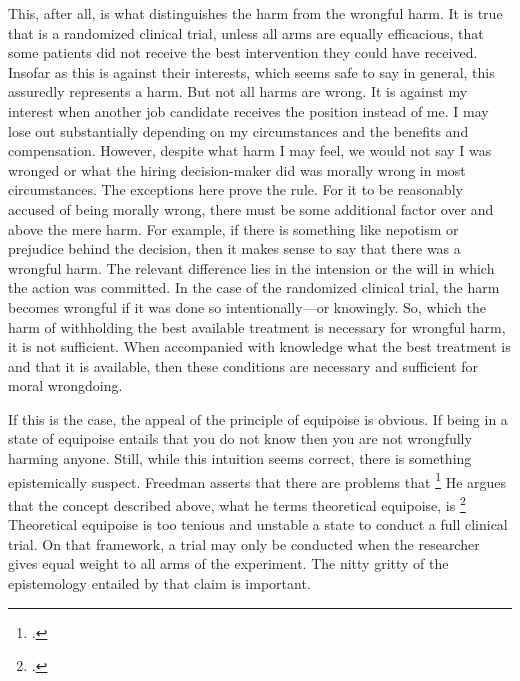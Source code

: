 \documentclass[letterpaper,notitlepage,12pt]{article}
\begin{document}
This, after all, is what distinguishes the harm from the wrongful harm.
It is true that is a randomized clinical trial, unless all arms are equally
efficacious, that some patients did not receive the best intervention they could
have received.
Insofar as this is against their interests, which seems safe to say in general,
this assuredly represents a harm.
But not all harms are wrong.
It is against my interest when another job candidate receives the position
instead of me.
I may lose out substantially depending on my circumstances and the benefits and
compensation.
However, despite what harm I may feel, we would not say I was wronged or what
the hiring decision-maker did was morally wrong in most circumstances.
The exceptions here prove the rule.
For it to be reasonably accused of being morally wrong, there must be some
additional factor over and above the mere harm.
For example, if there is something like nepotism or prejudice behind the
decision, then it makes sense to say that there was a wrongful harm.
The relevant difference lies in the intension or the will in which the action
was committed.
In the case of the randomized clinical trial, the harm becomes wrongful if it
was done so intentionally---or knowingly.
So, which the harm of withholding the best available treatment is necessary for
wrongful harm, it is not sufficient.
When accompanied with knowledge what the best treatment is and that it is
available, then these conditions are necessary and sufficient for moral
wrongdoing.

If this is the case, the appeal of the principle of equipoise is obvious.
If being in a state of equipoise entails that you do not know then you are not
wrongfully harming anyone.
Still, while this intuition seems correct, there is something epistemically
suspect.
Freedman asserts that there are problems that \footcite[p. 141]{freedman_equipoise_1987}
He argues that the concept described above, what he terms theoretical equipoise,
is \footcite[p.
429]{freedman_equipoise_1987}
Theoretical equipoise is too tenious and unstable a state to conduct a full
clinical trial.
On that framework, a trial may only be conducted when the researcher gives equal
weight to all arms of the experiment.
The nitty gritty of the epistemology entailed by that claim is important.
\end{document}
